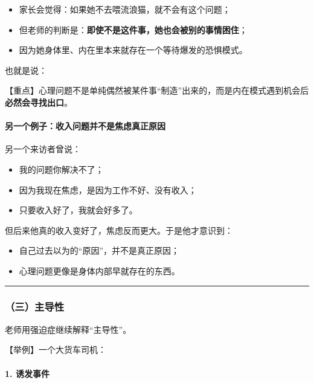 \documentclass[
  chinese,
  9pt,
  a4paper,
]{ctexart}
\providecommand{\tightlist}{%
  \setlength{\itemsep}{0pt}\setlength{\parskip}{0pt}}
\begin{document}
\begin{itemize}
\tightlist
\item
  家长会觉得：如果她不去喂流浪猫，就不会有这个问题；
\item
  但老师的判断是：\textbf{即使不是这件事，她也会被别的事情困住}；
\item
  因为她身体里、内在里本来就存在一个等待爆发的恐惧模式。
\end{itemize}

也就是说：

【重点】心理问题不是单纯偶然被某件事``制造''出来的，而是内在模式遇到机会后\textbf{必然会寻找出口}。

\paragraph{另一个例子：收入问题并不是焦虑真正原因}\label{ux53e6ux4e00ux4e2aux4f8bux5b50ux6536ux5165ux95eeux9898ux5e76ux4e0dux662fux7126ux8651ux771fux6b63ux539fux56e0}

另一个来访者曾说：

\begin{itemize}
\tightlist
\item
  我的问题你解决不了；
\item
  因为我现在焦虑，是因为工作不好、没有收入；
\item
  只要收入好了，我就会好多了。
\end{itemize}

但后来他真的收入变好了，焦虑反而更大。于是他才意识到：

\begin{itemize}
\tightlist
\item
  自己过去以为的``原因''，并不是真正原因；
\item
  心理问题更像是身体内部早就存在的东西。
\end{itemize}

\begin{center}\rule{0.5\linewidth}{0.5pt}\end{center}

\subsubsection{（三）主导性}\label{ux4e09ux4e3bux5bfcux6027}

老师用强迫症继续解释``主导性''。

【举例】一个大货车司机：

\paragraph{1. 诱发事件}\label{ux8bf1ux53d1ux4e8bux4ef6}
\end{document}
